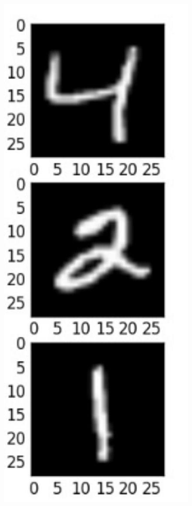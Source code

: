 \documentclass[10pt]{article}
\begin{document}
\begin{center}
\includegraphics[max width=\textwidth]{2024_01_08_959e2db67a31f073f6d2g-23}
\end{center}
\end{document}
